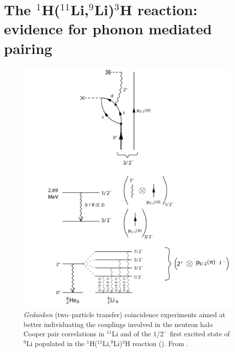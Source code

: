  \section[Evidence for phonon mediated pairing]{The $^1$H($^{11}$Li,$^9$Li)$^3$H reaction: evidence for phonon mediated pairing}\label{C8S1}
    \begin{figure}
    \centerline{\includegraphics*[width=16cm,angle=0]{C8/figsC8/fig8_1_3x}}
    	\caption{\emph{Gedanken} (two--particle transfer) coincidence experiments aimed at better individuating the couplings involved in the neutron halo Cooper pair correlations in $^{11}$Li and of the $1/2^-$ first excited state of $^9$Li populated in the  
    	 $^1$H($^{11}$Li,$^9$Li)$^3$H  reaction (\cite{Tanihata:08,Barranco:01,Potel:10}). From \cite{Potel:14}.}\label{fig8_1_3}
    \end{figure}
